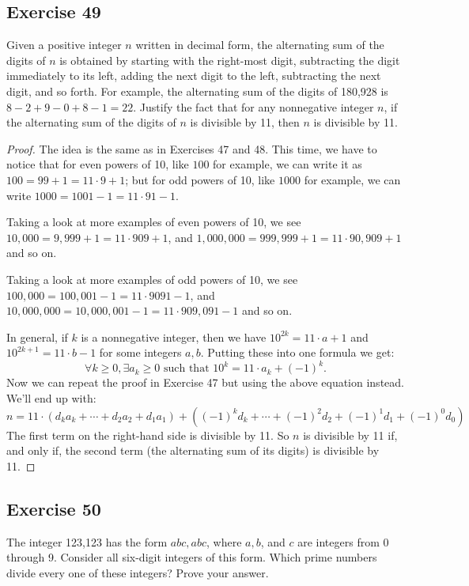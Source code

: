 \documentclass[14pt]{extarticle}
\newcommand{\fa}{\forall}
\newcommand{\te}{\exists}
\begin{document}
\subsection{Exercise 49}
Given a positive integer $n$ written in decimal form, the alternating sum of the digits of $n$ is obtained by starting with the right-most digit, subtracting the digit immediately to its left, adding the next digit to the left, subtracting the next digit, and so forth. For example, the alternating sum of the digits of 180,928 is $8 - 2 + 9 - 0 + 8 - 1 = 22$. Justify the fact that for any nonnegative integer $n$, if the alternating sum of the digits of $n$ is divisible by 11, then $n$ is divisible by 11.

\begin{proof}
    The idea is the same as in Exercises 47 and 48. This time, we have to notice that for even powers of 10, like $100$ for example, we can write it as $100 = 99 + 1 = 11 \cdot 9 + 1$; but for odd powers of 10, like $1000$ for example, we can write $1000 = 1001 - 1 = 11 \cdot 91 - 1$.

    Taking a look at more examples of even powers of 10, we see $10,000 = 9,999 + 1 = 11 \cdot 909 + 1$, and $1,000,000 = 999,999 + 1 = 11 \cdot 90,909 + 1$ and so on.

    Taking a look at more examples of odd powers of 10, we see $100,000 = 100,001 - 1 = 11 \cdot 9091 - 1$, and $10,000,000 = 10,000,001 - 1 = 11 \cdot 909,091 - 1$ and so on.

    In general, if $k$ is a nonnegative integer, then we have $10^{2k} = 11 \cdot a + 1$ and $10^{2k+1} = 11 \cdot b - 1$ for some integers $a, b$. Putting these into one formula we get:
    \[
        \fa k \geq 0, \te a_k \geq 0 \text{ such that } 10^{k} = 11 \cdot a_k + (-1)^k.
    \]
    Now we can repeat the proof in Exercise 47 but using the above equation instead. We'll end up with:
    \[
        n = 11 \cdot(d_ka_k +\cdots + d_2 a_2 + d_1a_1) + ((-1)^{k}d_k +  \cdots + (-1)^{2}d_2 + (-1)^{1}d_1 + (-1)^{0}d_0)
    \]
    The first term on the right-hand side is divisible by 11. So $n$ is divisible by 11 if, and only if, the second term (the alternating sum of its digits) is divisible by 11.
\end{proof}

\subsection{Exercise 50}
The integer 123,123 has the form $abc,abc$, where $a, b$, and $c$ are integers from 0 through 9. Consider all six-digit integers of this form. Which prime numbers divide every one of these integers? Prove your answer.
\end{document}
